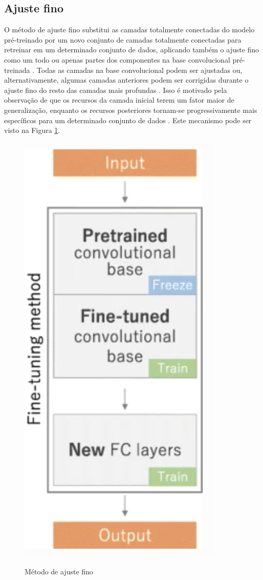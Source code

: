 \documentclass[
	12pt,				%
	oneside,			%
	a4paper,			%
	english,			%
	brazil				%
	]{abntex2ppgsi}
\begin{document}
\subsection{Ajuste fino}
O método de ajuste fino substitui as camadas totalmente conectadas do modelo pré-treinado por um novo conjunto de camadas totalmente conectadas para retreinar em um determinado conjunto de dados, aplicando também o ajuste fino como um todo ou apenas partes dos componentes na base convolucional pré-treinada \cite{li2017learning}. Todas as camadas na base convolucional podem ser ajustadas ou, alternativamente, algumas camadas anteriores podem ser corrigidas durante o ajuste fino do resto das camadas mais profundas \cite{li2017learning}. Isso é motivado pela observação de que os recursos da camada inicial terem um fator maior de generalização, enquanto os recursos posteriores tornam-se progressivamente mais específicos para um determinado conjunto de dados \cite{li2017learning}. Este mecanismo pode ser visto na Figura \ref{fig:fine_tuning_method}.

\begin{figure}[H]
    \centering
    \caption{Método de ajuste fino}
    \includegraphics[scale=.55]{imagens/conceitos_basicos/fine_tuning_method.png}
    \label{fig:fine_tuning_method}
\end{figure}
\end{document}
